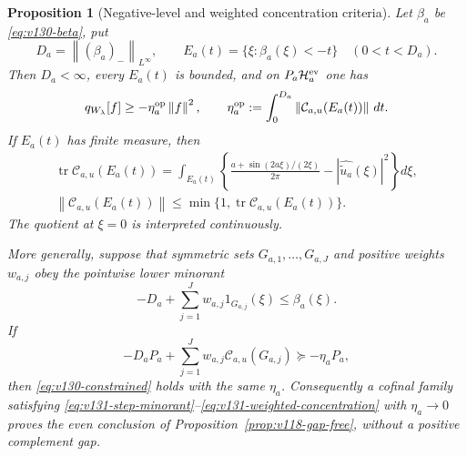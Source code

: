 \documentclass[11pt]{article}
\newtheorem{proposition}[theorem]{Proposition}
\theoremstyle{remark}
\newcommand{\norm}[1]{\left\lVert #1\right\rVert}
\begin{document}
\begin{proposition}[Negative-level and weighted concentration criteria]
\label{prop:v131-concentration}
Let $\beta_a$ be \eqref{eq:v130-beta}, put
\[
 D_a=\norm{(\beta_a)_-}_{L^\infty},\qquad
 E_a(t)=\{\xi:\beta_a(\xi)<-t\}\quad(0<t<D_a).
\]
Then $D_a<\infty$, every $E_a(t)$ is bounded, and on
$P_a\mathcal H_a^{\rm ev}$ one has
\begin{equation}\label{eq:v131-layercake}
 q_{W_\lambda}[f]\ge-\eta_a^{\rm op}\norm f^2,
 \qquad
 \eta_a^{\rm op}:=
 \int_0^{D_a}\norm{\mathcal C_{a,u}(E_a(t))}\,dt.
\end{equation}
If $E_a(t)$ has finite measure, then
\begin{align}
 \operatorname {tr}\mathcal C_{a,u}(E_a(t))
  =\int_{E_a(t)}\left\{
    \frac{a+\sin(2a\xi)/(2\xi)}{2\pi}
    -|\widehat{\widetilde u_a}(\xi)|^2\right\}d\xi,
 \label{eq:v131-trace}\\
 \norm{\mathcal C_{a,u}(E_a(t))}
  \le \min\{1,\operatorname {tr}\mathcal C_{a,u}(E_a(t))\}.
 \label{eq:v131-trace-bound}
\end{align}
The quotient at $\xi=0$ is interpreted continuously.

More generally, suppose that symmetric sets $G_{a,1},\ldots,G_{a,J}$
and positive weights $w_{a,j}$ obey the pointwise lower minorant
\begin{equation}\label{eq:v131-step-minorant}
 -D_a+\sum_{j=1}^Jw_{a,j}1_{G_{a,j}}(\xi)
 \le\beta_a(\xi).
\end{equation}
If
\begin{equation}\label{eq:v131-weighted-concentration}
 -D_aP_a+\sum_{j=1}^Jw_{a,j}\mathcal C_{a,u}(G_{a,j})
 \succeq-\eta_aP_a,
\end{equation}
then \eqref{eq:v130-constrained} holds with the same $\eta_a$.
Consequently a cofinal family satisfying
\eqref{eq:v131-step-minorant}--\eqref{eq:v131-weighted-concentration}
with $\eta_a\to0$ proves the even conclusion of
Proposition~\ref{prop:v118-gap-free}, without a positive complement
gap.
\end{proposition}
\end{document}
